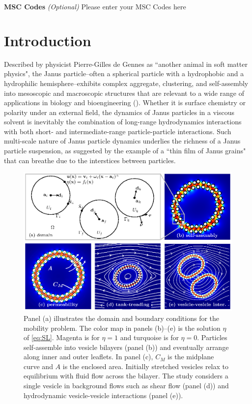 \documentclass[lineno]{jfm}
\begin{document}
{\bf MSC Codes }  {\it(Optional)} Please enter your MSC Codes here



\section{\label{intro}Introduction}
Described by physicist Pierre-Gilles de Gennes as ``another animal in soft matter physics", the
Janus particle--often a spherical particle with a hydrophobic and a
hydrophilic hemisphere--exhibits complex aggregate, clustering, and
self-assembly into mesoscopic and macroscopic structures that are
relevant to a wide range of applications in biology and bioengineering (\cite{deGennes1991}).
Whether it is surface chemistry or polarity under an external field, the
dynamics of Janus particles in a viscous solvent is inevitably the combination of long-range
hydrodynamics interactions with both short- and intermediate-range 
particle-particle interactions. Such multi-scale nature of Janus particle dynamics underlies 
the richness of a Janus particle suspension, as \cite{deGennes1991} suggested by the example of 
a ``thin film of Janus grains" that can breathe due to the interstices between particles.

\begin{figure}
\begin{center}
\includegraphics[width=\textwidth]{fig1.eps}
\end{center}
\caption{Panel (a) illustrates the domain and boundary conditions for
  the mobility problem. The color map in panels (b)--(e) is the solution 
  $\eta$ of \eqref{eq:SL}. Magenta is for $\eta  = 1$ and turquoise is for $\eta  = 0$.
  Particles self-assemble into vesicle bilayers (panel (b)) and
  eventually arrange along inner and outer leaflets. In panel (c), $C_M$
  is the midplane curve and $A$ is the enclosed area.
  Initially stretched vesicles relax to equilibrium with fluid
  flow across the bilayer. The study considers a single vesicle in
  background flows such as shear flow (panel (d)) and hydrodynamic
  vesicle-vesicle interactions (panel (e)).}
\label{fig:figure0}
\end{figure}
\end{document}
